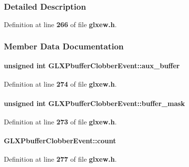 \subsubsection{Detailed Description}


Definition at line {\bf 266} of file {\bf glxew.\+h}.



\subsubsection{Member Data Documentation}
\paragraph[{aux\+\_\+buffer}]{\setlength{\rightskip}{0pt plus 5cm}unsigned {\bf int} G\+L\+X\+Pbuffer\+Clobber\+Event\+::aux\+\_\+buffer}\label{structGLXPbufferClobberEvent_a13193b6e7e3e52b15f754fe91403b7ec}


Definition at line {\bf 274} of file {\bf glxew.\+h}.

\paragraph[{buffer\+\_\+mask}]{\setlength{\rightskip}{0pt plus 5cm}unsigned {\bf int} G\+L\+X\+Pbuffer\+Clobber\+Event\+::buffer\+\_\+mask}\label{structGLXPbufferClobberEvent_aff4c23d00f6dad98427f8d32a5f10580}


Definition at line {\bf 273} of file {\bf glxew.\+h}.

\paragraph[{count}]{ G\+L\+X\+Pbuffer\+Clobber\+Event\+::count}\label{structGLXPbufferClobberEvent_a61e9f6b31738464dca67f909fcacd298}


Definition at line {\bf 277} of file {\bf glxew.\+h}.

